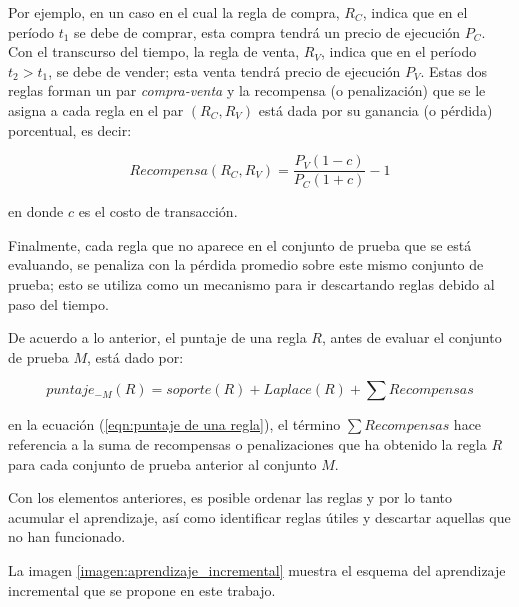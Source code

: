 \documentclass[12pt]{report}
\theoremstyle{break}
\theoremstyle{break}
\begin{document}
Por ejemplo, en un caso en el cual la regla de compra, $R_{C}$, indica que en el período $t_1$ se debe de comprar, esta compra tendrá un precio de ejecución $P_{C}$. Con el transcurso del tiempo, la regla de venta, $R_{V}$, indica que en el período $t_2 > t_1$, se debe de vender; esta venta tendrá precio de ejecución $P_{V}$. Estas dos reglas forman un par \textit{compra-venta} y la recompensa (o penalización) que se le asigna a cada regla en el par $\left(R_C, R_V\right)$ está dada por su ganancia (o pérdida) porcentual, es decir:

\begin{equation}\label{eqn:recompensa reglas}
Recompensa(R_C, R_V) = \dfrac{P_V (1 - c)}{P_C (1 + c) } - 1
\end{equation}

en donde $c$ es el costo de transacción.

Finalmente, cada regla que no aparece en el conjunto de prueba que se está evaluando, se penaliza con la pérdida promedio sobre este mismo conjunto de prueba; esto se utiliza como un mecanismo para ir descartando reglas debido al paso del tiempo.

De acuerdo a lo anterior, el puntaje de una regla $R$, antes de evaluar el conjunto de prueba $M$, está dado por:

\begin{equation} \label{eqn:puntaje de una regla}
puntaje_{-M}(R) = soporte(R) + Laplace(R) + \sum Recompensas
\end{equation}

en la ecuación (\ref{eqn:puntaje de una regla}), el término $ \sum Recompensas$ hace referencia a la suma de recompensas o penalizaciones que ha obtenido la regla $R$ para cada conjunto de prueba anterior al conjunto $M$.

Con los elementos anteriores, es posible ordenar las reglas y por lo tanto acumular el aprendizaje, así como identificar reglas útiles y descartar aquellas que no han funcionado.

La imagen \ref{imagen:aprendizaje_incremental} muestra el esquema del aprendizaje incremental que se propone en este trabajo.
\end{document}
